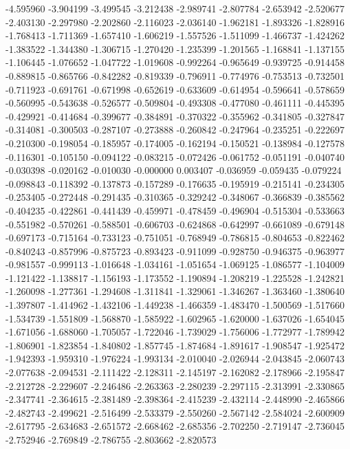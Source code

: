-4.595960
-3.904199
-3.499545
-3.212438
-2.989741
-2.807784
-2.653942
-2.520677
-2.403130
-2.297980
-2.202860
-2.116023
-2.036140
-1.962181
-1.893326
-1.828916
-1.768413
-1.711369
-1.657410
-1.606219
-1.557526
-1.511099
-1.466737
-1.424262
-1.383522
-1.344380
-1.306715
-1.270420
-1.235399
-1.201565
-1.168841
-1.137155
-1.106445
-1.076652
-1.047722
-1.019608
-0.992264
-0.965649
-0.939725
-0.914458
-0.889815
-0.865766
-0.842282
-0.819339
-0.796911
-0.774976
-0.753513
-0.732501
-0.711923
-0.691761
-0.671998
-0.652619
-0.633609
-0.614954
-0.596641
-0.578659
-0.560995
-0.543638
-0.526577
-0.509804
-0.493308
-0.477080
-0.461111
-0.445395
-0.429921
-0.414684
-0.399677
-0.384891
-0.370322
-0.355962
-0.341805
-0.327847
-0.314081
-0.300503
-0.287107
-0.273888
-0.260842
-0.247964
-0.235251
-0.222697
-0.210300
-0.198054
-0.185957
-0.174005
-0.162194
-0.150521
-0.138984
-0.127578
-0.116301
-0.105150
-0.094122
-0.083215
-0.072426
-0.061752
-0.051191
-0.040740
-0.030398
-0.020162
-0.010030
-0.000000
0.003407
-0.036959
-0.059435
-0.079224
-0.098843
-0.118392
-0.137873
-0.157289
-0.176635
-0.195919
-0.215141
-0.234305
-0.253405
-0.272448
-0.291435
-0.310365
-0.329242
-0.348067
-0.366839
-0.385562
-0.404235
-0.422861
-0.441439
-0.459971
-0.478459
-0.496904
-0.515304
-0.533663
-0.551982
-0.570261
-0.588501
-0.606703
-0.624868
-0.642997
-0.661089
-0.679148
-0.697173
-0.715164
-0.733123
-0.751051
-0.768949
-0.786815
-0.804653
-0.822462
-0.840243
-0.857996
-0.875723
-0.893423
-0.911099
-0.928750
-0.946375
-0.963977
-0.981557
-0.999113
-1.016648
-1.034161
-1.051654
-1.069125
-1.086577
-1.104009
-1.121422
-1.138817
-1.156193
-1.173552
-1.190894
-1.208219
-1.225528
-1.242821
-1.260098
-1.277361
-1.294608
-1.311841
-1.329061
-1.346267
-1.363460
-1.380640
-1.397807
-1.414962
-1.432106
-1.449238
-1.466359
-1.483470
-1.500569
-1.517660
-1.534739
-1.551809
-1.568870
-1.585922
-1.602965
-1.620000
-1.637026
-1.654045
-1.671056
-1.688060
-1.705057
-1.722046
-1.739029
-1.756006
-1.772977
-1.789942
-1.806901
-1.823854
-1.840802
-1.857745
-1.874684
-1.891617
-1.908547
-1.925472
-1.942393
-1.959310
-1.976224
-1.993134
-2.010040
-2.026944
-2.043845
-2.060743
-2.077638
-2.094531
-2.111422
-2.128311
-2.145197
-2.162082
-2.178966
-2.195847
-2.212728
-2.229607
-2.246486
-2.263363
-2.280239
-2.297115
-2.313991
-2.330865
-2.347741
-2.364615
-2.381489
-2.398364
-2.415239
-2.432114
-2.448990
-2.465866
-2.482743
-2.499621
-2.516499
-2.533379
-2.550260
-2.567142
-2.584024
-2.600909
-2.617795
-2.634683
-2.651572
-2.668462
-2.685356
-2.702250
-2.719147
-2.736045
-2.752946
-2.769849
-2.786755
-2.803662
-2.820573
